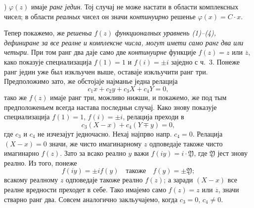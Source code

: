 ﻿\documentclass[11pt]{article}
\providecommand{\Yreal}{\mathfrak Y}
\begin{document}
) \(\varphi(z)\) имаје {\itshape ранг једин}. Тој случај не може настати в области комплексных чисел; в области {\itshape реалных} чисел он значи {\itshape континуирно} решенье \(\varphi(x)=C\cdot x\).

Тепер покажемо, же {\itshape решеньа} \(f(z)\) {\itshape функционалных уравнень (1)--(4), дефиниране за все реалне и комплексне числа, могут имети само ранг два или четыри}. При том ранг два даје само две {\itshape континуирне} функције \(f(z)=z\) или \(\overline z\), како показује специализација \(f(1)=1\) и \(f(i)=\pm i\) заједно с ч.~3. Понеже ранг једин уже был изкльучен выше, оставаје изкльучити ранг три. Предположимо зато, же обстојаје најманье једна релација
\[
c_1x+c_2y+c_3X+c_4Y=0,
\]
тако же \(f(z)\) имаје ранг три, можливо нижши, и покажемо, же под тым предположеньем всегда настава последньи случај. Како знову показује специализација \(f(1)=1\), \(f(i)=\pm i\), релација преходи в
\[
c_3(X-x)+c_4(Y\mp y)=0,
\]
где \(c_3\) и \(c_4\) не изчезајут једночасно. Нехај најпрво напр. \(c_4=0\). Релација \((X-x)=0\) значи, же чисто имагинарному \(z\) одповедаје такоже чисто имагинарно \(f(z)\). Зато за всако реално \(y\) важи \(f(iy)=i\cdot\Yreal\), где \(\Yreal\) јест знову реално. Из того, понеже
\[
f(iy)=\pm i f(y)\quad\text{такоже}\quad f(y)=\pm\Yreal;
\]
всакому реалному \(z\) одповедаје такоже реално \(f(z)\); а заради \((X-x)\) все реалне вредности преходет в себе. Тако имајемо само \(f(z)=z\) или \(\overline z\), значи стварно ранг два. Совсем аналогично закльучајемо, когда \(c_3=0\), \(c_4\ne0\).
\end{document}

